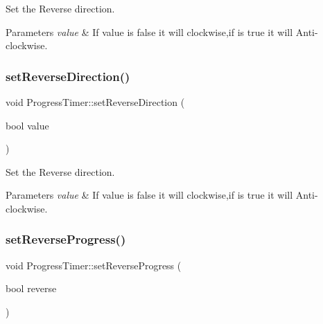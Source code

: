 Set the Reverse direction.


\begin{DoxyParams}{Parameters}
{\em value} & If value is false it will clockwise,if is true it will Anti-\/clockwise. \\
\hline
\end{DoxyParams}
\mbox{\label{classProgressTimer_a1bfa9056523c014a8453caf962a1e69c}} 
\subsubsection{\texorpdfstring{set\+Reverse\+Direction()}{setReverseDirection()}\hspace{0.1cm}{\footnotesize\ttfamily [2/2]}}
{\footnotesize\ttfamily void Progress\+Timer\+::set\+Reverse\+Direction (\begin{DoxyParamCaption}\item[{bool}]{value }\end{DoxyParamCaption})\hspace{0.3cm}{\ttfamily [inline]}}

Set the Reverse direction.


\begin{DoxyParams}{Parameters}
{\em value} & If value is false it will clockwise,if is true it will Anti-\/clockwise. \\
\hline
\end{DoxyParams}
\mbox{\label{classProgressTimer_a59c9d45e3083b9af6e95b0138dae3fed}} 
\subsubsection{\texorpdfstring{set\+Reverse\+Progress()}{setReverseProgress()}\hspace{0.1cm}{\footnotesize\ttfamily [1/2]}}
{\footnotesize\ttfamily void Progress\+Timer\+::set\+Reverse\+Progress (\begin{DoxyParamCaption}\item[{bool}]{reverse }\end{DoxyParamCaption})}


